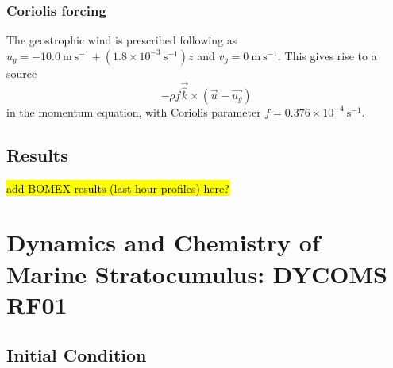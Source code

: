 \documentclass{report}
\begin{document}
\subsubsection{Coriolis forcing}

The geostrophic wind is prescribed following \cite{Siebesma2003} as $u_g = -10.0~\mathrm{m~s^{-1}} + (1.8\times10^{-3}~\mathrm{s^{-1}})z$  and $v_g = 0~\mathrm{m~s^{-1}}$. This gives rise to a source
\[
-\rho f\vec{\hat k} \times (\vec{u}-\vec{u_g})
\]
in the momentum equation, with Coriolis parameter $f = 0.376\times10^{-4}~\mathrm{s^{-1}}$.

\subsection{Results}
\hl{add BOMEX results (last hour profiles) here?}


\section{Dynamics and Chemistry of Marine Stratocumulus: DYCOMS RF01}

\subsection{Initial Condition}
\end{document}
